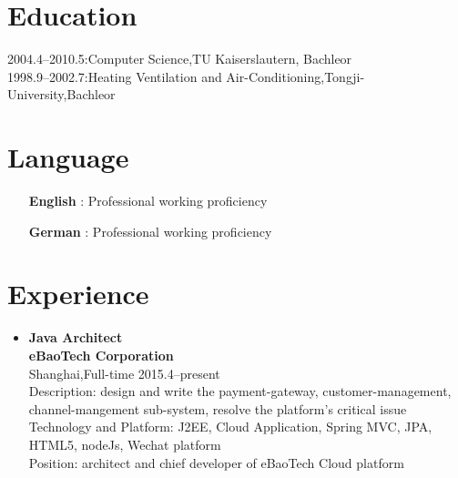 \documentclass[a4paper,11pt]{res}
\begin{document}
 

\address{\bf  Permanent Address\\Donglu Lu 1350 Nong 21 Hao 501 Shi\\201206 Shanghai\\0086-18101890138\\klose911@googlemail.com}

\begin{resume}

  \section{Education}          
  2004.4--2010.5:\hfill Computer Science,TU Kaiserslautern, Bachleor\\
  1998.9--2002.7:\hfill Heating Ventilation and Air-Conditioning,Tongji-University,Bachleor

  \section{Language}
  \begin{itemize}
  \item[{\bf English}]: \hfill Professional working proficiency
  \item[{\bf German}]: \hfill Professional working proficiency
  \end{itemize}

  \section{Experience}

  \begin{itemize}
  \item{\bf Java Architect}\\ {\bf eBaoTech Corporation}\\ Shanghai,Full-time \hfill 2015.4--present\\
    Description: design and write the payment-gateway,
    customer-management, channel-mangement sub-system,
    resolve the platform's critical issue \\  
    Technology and Platform: J2EE, Cloud Application, Spring MVC, JPA, HTML5, nodeJs, Wechat platform  \\
    Position: architect and chief developer of eBaoTech Cloud platform \\


\end{itemize}
\end{resume}
\end{document}

